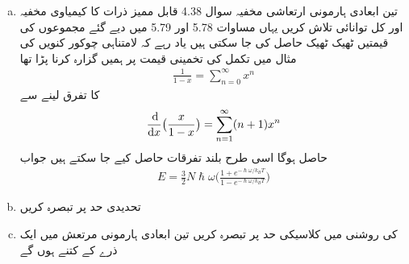 \begin{enumerate}[a.]
\item
تین ابعادی ہارمونی ارتعاشی مخفیہ سوال
4.38 قابل ممیز ذرات کا کیمیاوی مخفیہ اور کل توانائی تلاش کریں یہاں مساوات 5.78 اور 5.79 میں دیے گئے مجموعوں کی قیمتیں ٹھیک ٹھیک حاصل کی جا سکتی ہیں یاد رہے کہ لامتناہی چوکور کنویں  کی مثال میں تکمل کی تخمینی قیمت پر ہمیں گزارہ کرنا پڑا تھا  
\begin{align}
\frac{1}{1 - x} = \sum_{n = 0}^{\infty} x^{n}
\end{align}
کا تفرق لینے سے 
\begin{align*}
\frac{\dif}{\dif x} \big ( \frac{x}{1 - x} \big ) = \sum_{n = 1}^{\infty} (n + 1) x^{n}
\end{align*}
حاصل ہوگا اسی طرح بلند تفرقات حاصل کیے جا سکتے ہیں جواب 
\begin{align}
E = \frac{3}{2} N \hslash \omega \big ( \frac{1 + e^{- \hslash \omega / k_B T}}{1 - e^{- \hslash \omega / k_B T}} \big )
\end{align}
\item
تحدیدی حد  پر تبصرہ کریں 
\item
{}  کی روشنی میں کلاسیکی حد  پر تبصرہ کریں تین ابعادی  ہارمونی مرتعش میں ایک ذرے کے  کتنے ہوں گے 
\end{enumerate}

